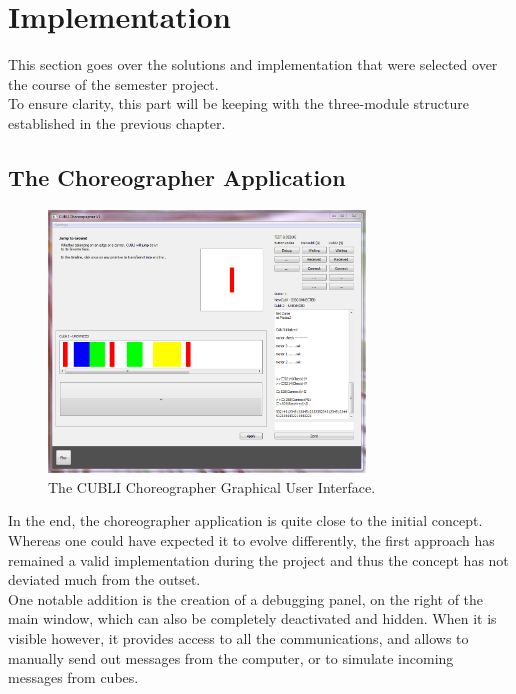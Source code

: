 \chapter{Implementation}\label{sec:implementation}

This section goes over the solutions and implementation that were selected over the course of the semester project. \\

To ensure clarity, this part will be keeping with the three-module  structure established in the previous chapter. 

\section{The Choreographer Application}

\begin{figure}[ht]
   \centering
   \includegraphics[width=0.75\textwidth]{img/ChoreographerGUI.png}
   \caption{The CUBLI Choreographer Graphical User Interface.}
   \label{img:ChoreographerGUI}
\end{figure}

In the end, the choreographer application is quite close to the initial concept. Whereas one could have expected it to evolve differently, the first approach has remained a valid implementation during the project and thus the concept has not deviated much from the outset.\\

One notable addition is the creation of a debugging panel, on the right of the main window, which can also be completely deactivated and hidden. When it is visible however, it provides access to all the communications, and allows to manually send out messages from the computer, or to simulate incoming messages from cubes.\\

